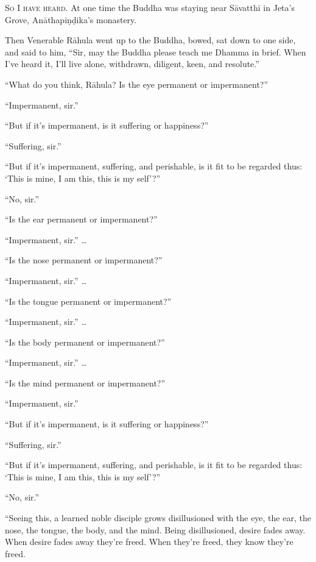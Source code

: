 \documentclass[12pt,openany]{book}%
\newcommand*{\scevam}[1]{\textsc{#1}}
\begin{document}
\scevam{So I have heard. }At one time the Buddha was staying near \textsanskrit{Sāvatthī} in Jeta’s Grove, \textsanskrit{Anāthapiṇḍika}’s monastery. 

Then Venerable \textsanskrit{Rāhula} went up to the Buddha, bowed, sat down to one side, and said to him, “Sir, may the Buddha please teach me Dhamma in brief. When I’ve heard it, I’ll live alone, withdrawn, diligent, keen, and resolute.” 

“What do you think, \textsanskrit{Rāhula}? Is the eye permanent or impermanent?” 

“Impermanent, sir.” 

“But if it’s impermanent, is it suffering or happiness?” 

“Suffering, sir.” 

“But if it’s impermanent, suffering, and perishable, is it fit to be regarded thus: ‘This is mine, I am this, this is my self’?” 

“No, sir.” 

“Is the ear permanent or impermanent?” 

“Impermanent, sir.” … 

“Is the nose permanent or impermanent?” 

“Impermanent, sir.” … 

“Is the tongue permanent or impermanent?” 

“Impermanent, sir.” … 

“Is the body permanent or impermanent?” 

“Impermanent, sir.” … 

“Is the mind permanent or impermanent?” 

“Impermanent, sir.” 

“But if it’s impermanent, is it suffering or happiness?” 

“Suffering, sir.” 

“But if it’s impermanent, suffering, and perishable, is it fit to be regarded thus: ‘This is mine, I am this, this is my self’?” 

“No, sir.” 

“Seeing this, a learned noble disciple grows disillusioned with the eye, the ear, the nose, the tongue, the body, and the mind. Being disillusioned, desire fades away. When desire fades away they’re freed. When they’re freed, they know they’re freed. 
\end{document}
